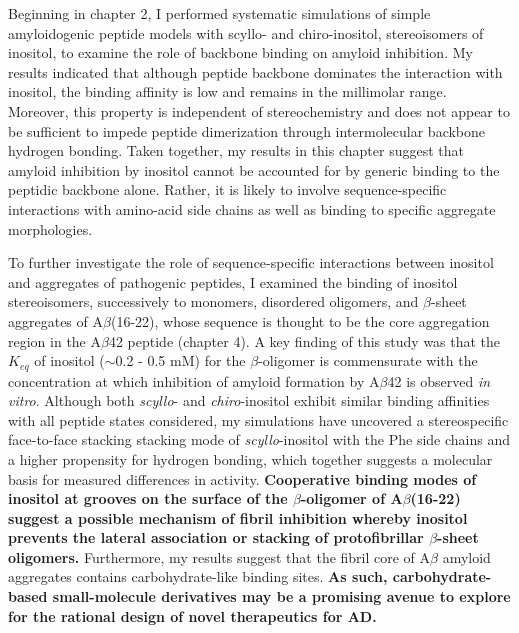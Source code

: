 Beginning in chapter 2, I performed systematic simulations of simple amyloidogenic peptide models with scyllo- and chiro-inositol, stereoisomers of inositol, to examine the role of backbone binding on amyloid inhibition. My results indicated that although peptide backbone dominates the interaction with inositol, the binding affinity is low and remains in the millimolar range. Moreover, this property is independent of stereochemistry and does not appear to be sufficient to impede peptide dimerization through intermolecular backbone hydrogen bonding. Taken together, my results in this chapter suggest that amyloid inhibition by inositol cannot be accounted for by generic binding to the peptidic backbone alone. Rather, it is likely to involve sequence-specific interactions with amino-acid side chains as well as binding to specific aggregate morphologies.

To further investigate the role of sequence-specific interactions between inositol and aggregates of pathogenic peptides, I examined the binding of  inositol stereoisomers, successively to monomers, disordered oligomers, and $\beta$-sheet aggregates of A$\beta$(16-22), whose sequence is thought to be the core aggregation region in the A$\beta$42 peptide (chapter 4). A key finding of this study was that the $K_{eq}$ of inositol ($\sim$0.2 - 0.5 mM) for the $\beta$-oligomer is commensurate with the concentration at which inhibition of amyloid formation by A$\beta$42 is observed \emph{in vitro}. Although both \emph{scyllo}- and \emph{chiro}-inositol exhibit similar binding affinities with all peptide states considered, my simulations have uncovered a stereospecific face-to-face stacking stacking mode of \emph{scyllo}-inositol with the Phe side chains and a higher propensity for hydrogen bonding, which together suggests a molecular basis for measured differences in activity. \textbf{Cooperative binding modes of inositol at grooves on the surface of the $\beta$-oligomer of A$\beta$(16-22) suggest a possible mechanism of fibril inhibition whereby inositol prevents the lateral association or stacking of protofibrillar $\beta$-sheet oligomers.} Furthermore, my results suggest that the fibril core of A$\beta$ amyloid aggregates contains carbohydrate-like binding sites.  \textbf{As such, carbohydrate-based small-molecule derivatives may be a promising avenue to explore for the rational design of novel therapeutics for AD.}

